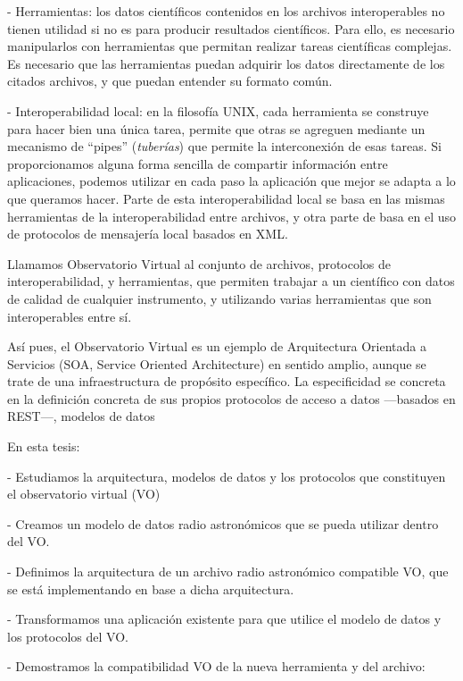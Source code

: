 {   - Herramientas: los datos científicos contenidos en los archivos 
     interoperables no tienen utilidad si no es para producir resultados 
     científicos. Para ello, es necesario manipularlos con herramientas 
     que permitan realizar tareas científicas complejas. Es necesario que 
     las herramientas puedan adquirir los datos directamente de los citados 
     archivos, y que puedan entender su formato común.

   - Interoperabilidad local: en la filosofía UNIX, cada herramienta se 
     construye para hacer bien una única tarea, permite que otras se agreguen 
     mediante un mecanismo de ``pipes'' (\emph{tuberías}) que permite la 
     interconexión de esas tareas. Si proporcionamos alguna forma sencilla de
     compartir información entre aplicaciones, podemos utilizar en cada paso 
     la aplicación que mejor se adapta a lo que queramos hacer. Parte de esta 
     interoperabilidad local se basa en las mismas herramientas de la 
     interoperabilidad entre archivos, y otra parte de basa en el uso de 
     protocolos de mensajería local basados en XML.

Llamamos Observatorio Virtual al conjunto de archivos, protocolos de 
interoperabilidad, y herramientas, que permiten trabajar a un científico con 
datos de calidad de cualquier instrumento, y utilizando varias herramientas 
que son interoperables entre sí.

Así pues, el Observatorio Virtual es un ejemplo de Arquitectura Orientada a 
Servicios (SOA, Service Oriented Architecture) en sentido amplio, aunque se 
trate de una infraestructura de propósito específico. 
La especificidad se concreta en la definición concreta de sus propios 
protocolos de acceso a datos ---basados en REST---, modelos de datos

En esta tesis:

- Estudiamos la arquitectura, modelos de datos y los protocolos que constituyen
  el observatorio virtual (VO)

- Creamos un modelo de datos radio astronómicos que se pueda utilizar dentro 
  del VO.

- Definimos la arquitectura de un archivo radio astronómico compatible VO,
  que se está implementando en base a dicha arquitectura.

- Transformamos una aplicación existente para que utilice el modelo
  de datos y los protocolos del VO.

- Demostramos la compatibilidad VO de la nueva herramienta y del archivo:

}
